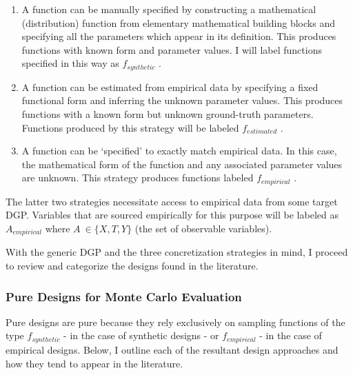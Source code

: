 \documentclass[../main.tex]{subfiles}
\begin{document}
\vspace{\baselineskip}
\begin{enumerate}
    \item A function can be manually specified by constructing a mathematical (distribution) function from elementary mathematical building blocks and specifying all the parameters which appear in its definition. This produces functions with known form and parameter values. I will label functions specified in this way as  \( f_{synthetic} \) . \par


\vspace{\baselineskip}
    \item A function can be estimated from empirical data by specifying a fixed functional form and inferring the unknown parameter values. This produces functions with a known form but unknown ground-truth parameters. Functions produced by this strategy will be labeled  \( f_{estimated} \) . \par


\vspace{\baselineskip}
    \item A function can be ‘specified’ to exactly match empirical data. In this case, the mathematical form of the function and any associated parameter values are unknown. This strategy produces functions labeled  \( f_{empirical} \) .
\end{enumerate}\par


\vspace{\baselineskip}
The latter two strategies necessitate access to empirical data from some target DGP. Variables that are sourced empirically for this purpose will be labeled as  \( A_{empirical} \)  where  \( A~ \in  \{ X, T, Y \}  \) (the set of observable variables).\par


\vspace{\baselineskip}
With the generic DGP and the three concretization strategies in mind, I proceed to review and categorize the designs found in the literature.\par

\subsubsection{Pure Designs for Monte Carlo Evaluation}

Pure designs are pure because they rely exclusively on sampling functions of the type  \( f_{synthetic} \)  - in the case of synthetic designs - or  \( f_{empirical} \) - in the case of empirical designs. Below, I outline each of the resultant design approaches and how they tend to appear in the literature.\par
\end{document}
